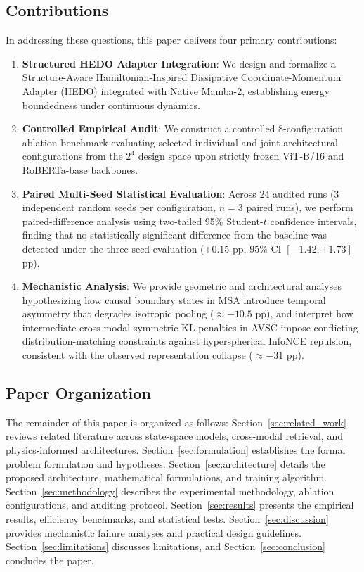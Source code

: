 \documentclass[conference]{IEEEtran}
\begin{document}
\subsection{Contributions}
In addressing these questions, this paper delivers four primary contributions:
\begin{enumerate}
    \item \textbf{Structured HEDO Adapter Integration}: We design and formalize a Structure-Aware Hamiltonian-Inspired Dissipative Coordinate-Momentum Adapter (HEDO) integrated with Native Mamba-2, establishing energy boundedness under continuous dynamics.
    \item \textbf{Controlled Empirical Audit}: We construct a controlled 8-configuration ablation benchmark evaluating selected individual and joint architectural configurations from the $2^4$ design space upon strictly frozen ViT-B/16 and RoBERTa-base backbones.
    \item \textbf{Paired Multi-Seed Statistical Evaluation}: Across 24 audited runs (3 independent random seeds per configuration, $n=3$ paired runs), we perform paired-difference analysis using two-tailed 95\% Student-$t$ confidence intervals, finding that no statistically significant difference from the baseline was detected under the three-seed evaluation ($+0.15$ pp, 95\% CI $[-1.42, +1.73]$ pp).
    \item \textbf{Mechanistic Analysis}: We provide geometric and architectural analyses hypothesizing how causal boundary states in MSA introduce temporal asymmetry that degrades isotropic pooling ($\approx -10.5$ pp), and interpret how intermediate cross-modal symmetric KL penalties in AVSC impose conflicting distribution-matching constraints against hyperspherical InfoNCE repulsion, consistent with the observed representation collapse ($\approx -31$ pp).
\end{enumerate}

\subsection{Paper Organization}
The remainder of this paper is organized as follows: Section~\ref{sec:related_work} reviews related literature across state-space models, cross-modal retrieval, and physics-informed architectures. Section~\ref{sec:formulation} establishes the formal problem formulation and hypotheses. Section~\ref{sec:architecture} details the proposed architecture, mathematical formulations, and training algorithm. Section~\ref{sec:methodology} describes the experimental methodology, ablation configurations, and auditing protocol. Section~\ref{sec:results} presents the empirical results, efficiency benchmarks, and statistical tests. Section~\ref{sec:discussion} provides mechanistic failure analyses and practical design guidelines. Section~\ref{sec:limitations} discusses limitations, and Section~\ref{sec:conclusion} concludes the paper.
\end{document}
